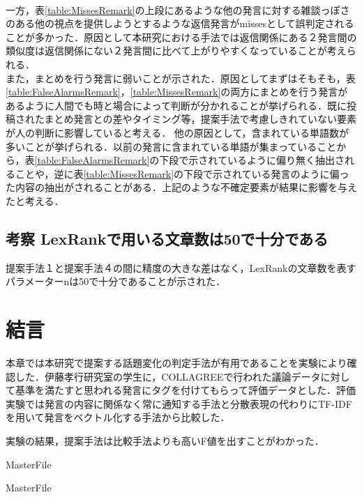 \\
一方，表\ref{table:MissesRemark}の上段にあるような他の発言に対する雑談っぽさのある他の視点を提供しようとするような返信発言がmissesとして誤判定されることが多かった．原因として本研究における手法では返信関係にある２発言間の類似度は返信関係にない２発言間に比べて上がりやすくなっていることが考えられる．
\\
また，まとめを行う発言に弱いことが示された．原因としてまずはそもそも，表\ref{table:FalseAlarmsRemark}，\ref{table:MissesRemark}の両方にまとめを行う発言があるように人間でも時と場合によって判断が分かれることが挙げられる．既に投稿されたまとめ発言との差やタイミング等，提案手法で考慮しきれていない要素が人の判断に影響していると考える．
他の原因として，含まれている単語数が多いことが挙げられる．以前の発言に含まれている単語が集まっていることから，表\ref{table:FalseAlarmsRemark}の下段で示されているように偏り無く抽出されることや，逆に表\ref{table:MissesRemark}の下段で示されている発言のように偏った内容の抽出がされることがある．上記のような不確定要素が結果に影響を与えたと考える．

\subsection*{考察 LexRankで用いる文章数は50で十分である}
提案手法１と提案手法４の間に精度の大きな差はなく，LexRankの文章数を表すパラメーターnは50で十分であることが示された．

\section{結言}
\label{exp:conclusion}
本章では本研究で提案する話題変化の判定手法が有用であることを実験により確認した．伊藤孝行研究室の学生に，COLLAGREEで行われた議論データに対して基準を満たすと思われる発言にタグを付けてもらって評価データとした．評価実験では発言の内容に関係なく常に通知する手法と分散表現の代わりにTF-IDFを用いて発言をベクトル化する手法から比較した．

実験の結果，提案手法は比較手法よりも高いF値を出すことがわかった．

 \expandafter\ifx\csname MasterFile\endcsname\relax
	\def\BibFile{hoge}
	
  \fi
  \expandafter\ifx\csname MasterFile\endcsname\relax

\fi

